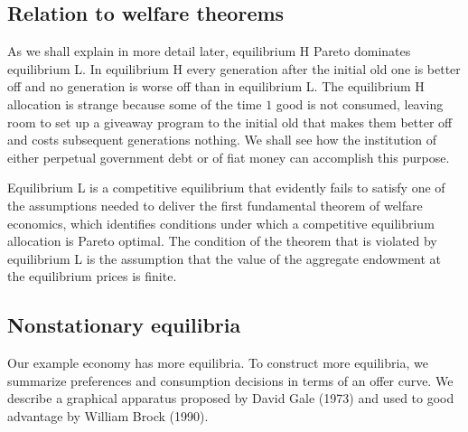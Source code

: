 \medskip
\subsection{Relation to welfare theorems}

As we shall explain in more detail later, equilibrium H Pareto dominates
equilibrium L.  In equilibrium H every generation after the initial
old one is better off and no generation is worse off than in equilibrium
L.
The equilibrium H allocation
is strange because some of the time $1$ good is not consumed, leaving
 room to set up a giveaway program to the initial
old that makes them better off and costs subsequent generations
nothing.  We shall see how the institution of  either perpetual government debt or of fiat money
can accomplish this purpose.

  Equilibrium L is a competitive equilibrium that evidently fails to satisfy
  one of the assumptions needed to deliver the
   first fundamental theorem of welfare economics, which identifies conditions under which
 a competitive equilibrium allocation is Pareto
optimal.
  The condition of the theorem that is violated by  equilibrium L
is the assumption that the value of the aggregate endowment
at the equilibrium prices is finite.

\subsection{Nonstationary equilibria}

Our example economy has more  equilibria.
To construct more equilibria, we summarize preferences and consumption
decisions in terms
of an offer curve.   We describe a graphical apparatus proposed
by David Gale (1973) and used  to good advantage by
William Brock (1990).
%
%

